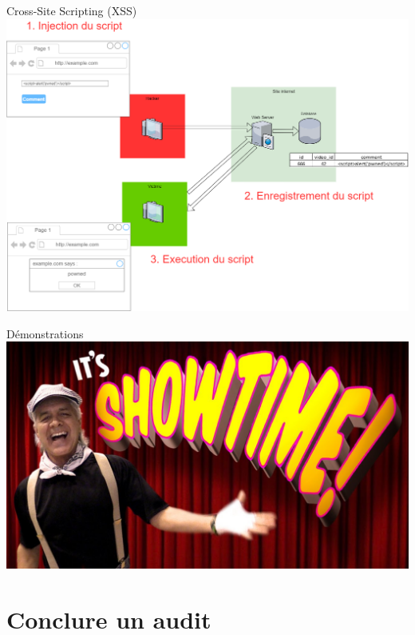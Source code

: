 \documentclass{beamer}
\begin{document}
\begin{frame}{Cross-Site Scripting (XSS)}
\centering
\includegraphics[width=0.92\paperwidth ]{schemas/images/XSS.png}
\end{frame}
\begin{frame}{Démonstrations}
\centering
\includegraphics[width=0.92\paperwidth ]{schemas/images/showtime.jpg}
\end{frame}

\section{Conclure un audit}	
\end{document}
